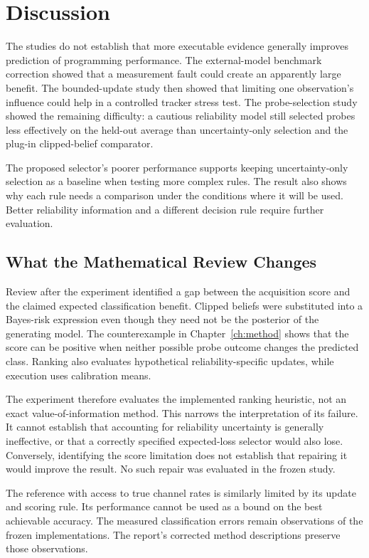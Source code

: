 \chapter{Discussion}
\label{ch:discussion}

The studies do not establish that more executable evidence generally improves prediction of programming performance. The external-model benchmark correction
showed that a measurement fault could create an apparently large benefit. The bounded-update study then showed that limiting one observation's influence
could help in a controlled tracker stress test. The probe-selection study showed the remaining difficulty: a cautious reliability model still selected
probes less effectively on the held-out average than uncertainty-only selection and the plug-in clipped-belief comparator.

The proposed selector's poorer performance supports keeping uncertainty-only selection as a baseline when testing more
complex rules. The result also shows why each rule needs a comparison under the conditions where it will be used.
Better reliability information and a different decision rule require further evaluation.

\section{What the Mathematical Review Changes}

Review after the experiment identified a gap between the acquisition score and the claimed expected classification benefit. Clipped
beliefs were substituted into a Bayes-risk expression even though they need not be the posterior of the generating model.
The counterexample in Chapter~\ref{ch:method} shows that the score can be positive when neither possible probe outcome changes
the predicted class. Ranking also evaluates hypothetical reliability-specific updates, while execution uses calibration means.

The experiment therefore evaluates the implemented ranking heuristic, not an exact value-of-information method. This narrows
the interpretation of its failure. It cannot establish that accounting for reliability uncertainty is generally ineffective,
or that a correctly specified expected-loss selector would also lose. Conversely, identifying the score limitation does not
establish that repairing it would improve the result. No such repair was evaluated in the frozen study.

The reference with access to true channel rates is similarly limited by its update and scoring rule. Its performance cannot
be used as a bound on the best achievable accuracy. The measured classification errors remain observations of the frozen
implementations. The report's corrected method descriptions preserve those observations.

